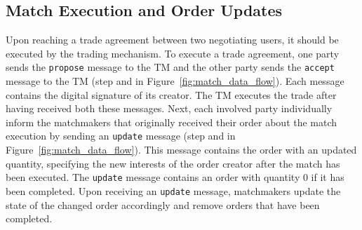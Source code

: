 \subsection{Match Execution and Order Updates}
Upon reaching a trade agreement between two negotiating users, it should be executed by the trading mechanism.
To execute a trade agreement, one party sends the \texttt{propose} message to the TM and the other party sends the \texttt{accept} message to the TM (step  and  in Figure~\ref{fig:match_data_flow}).
Each message contains the digital signature of its creator.
The TM executes the trade after having received both these messages.
Next, each involved party individually inform the matchmakers that originally received their order about the match execution by sending an \texttt{update} message (step  and  in Figure~\ref{fig:match_data_flow}).
This message contains the order with an updated quantity, specifying the new interests of the order creator after the match has been executed.
The \texttt{update} message contains an order with quantity 0 if it has been completed.
Upon receiving an \texttt{update} message, matchmakers update the state of the changed order accordingly and remove orders that have been completed.


